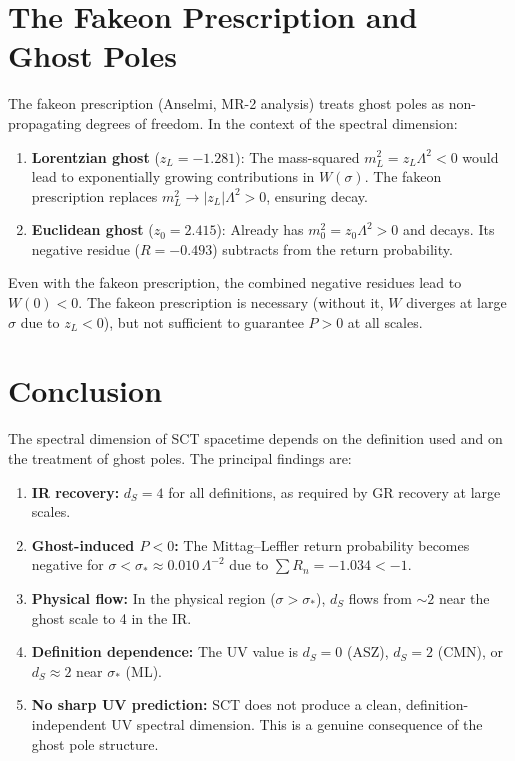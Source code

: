 \documentclass[11pt,a4paper]{article}
\newcommand{\ds}{d_S}
\begin{document}
\section{The Fakeon Prescription and Ghost Poles}
\label{sec:fakeon}

The fakeon prescription (Anselmi, MR-2 analysis) treats ghost poles
as non-propagating degrees of freedom. In the context of the spectral
dimension:

\begin{enumerate}
  \item \textbf{Lorentzian ghost} ($z_L = -1.281$): The mass-squared
    $m_L^2 = z_L\Lambda^2 < 0$ would lead to exponentially growing
    contributions in $W(\sigma)$. The fakeon prescription replaces
    $m_L^2 \to |z_L|\Lambda^2 > 0$, ensuring decay.
  \item \textbf{Euclidean ghost} ($z_0 = 2.415$): Already has
    $m_0^2 = z_0\Lambda^2 > 0$ and decays. Its negative residue
    ($R = -0.493$) subtracts from the return probability.
\end{enumerate}

Even with the fakeon prescription, the combined negative residues
lead to $W(0) < 0$. The fakeon prescription is necessary (without it,
$W$ diverges at large $\sigma$ due to $z_L < 0$), but not sufficient
to guarantee $P > 0$ at all scales.


\section{Conclusion}
\label{sec:conclusion}

The spectral dimension of SCT spacetime depends on the definition used
and on the treatment of ghost poles. The principal findings are:

\begin{enumerate}
  \item \textbf{IR recovery:} $\ds = 4$ for all definitions, as required
    by GR recovery at large scales.
  \item \textbf{Ghost-induced $P < 0$:} The Mittag--Leffler return
    probability becomes negative for $\sigma < \sigma_* \approx 0.010\,\Lambda^{-2}$
    due to $\sum R_n = -1.034 < -1$.
  \item \textbf{Physical flow:} In the physical region
    ($\sigma > \sigma_*$), $\ds$ flows from $\sim 2$ near the ghost scale
    to 4 in the IR.
  \item \textbf{Definition dependence:} The UV value is
    $\ds = 0$ (ASZ), $\ds = 2$ (CMN), or $\ds \approx 2$ near $\sigma_*$ (ML).
  \item \textbf{No sharp UV prediction:} SCT does not produce a clean,
    definition-independent UV spectral dimension. This is a genuine
    consequence of the ghost pole structure.
\end{enumerate}
\end{document}
